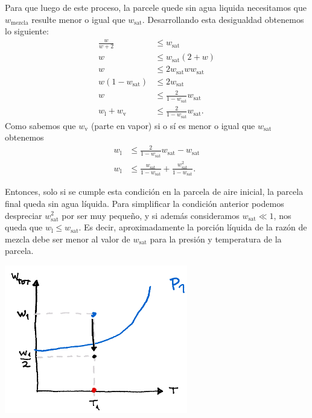 \documentclass[../main.tex]{subfiles}
\begin{document}
\begin{enumerate}[a)]
\begin{enumerate}
Para que luego de este proceso, la parcele quede sin agua liquida necesitamos que $w_\text{mezcla}$ resulte menor o igual que $w_\text{sat}$. Desarrollando esta desigualdad obtenemos lo siguiente:
\begin{align*}
    \frac{w}{w+2} &\le w_\text{sat}\\
    w &\le  w_\text{sat}(2 + w)\\
    w &\le 2w_\text{sat} ww_\text{sat}\\
    w(1-w_\text{sat}) &\le 2w_\text{sat}\\
    w &\le \frac{2}{1-w_\text{sat}} w_\text{sat}\\
    w_\text{l} + w_\text{v} &\le \frac{2}{1-w_\text{sat}} w_\text{sat}
.\end{align*}
Como sabemos que  $w_\text{v}$ (parte en vapor) si o sí es menor o igual que $w_\text{sat}$ obtenemos
    \begin{align*}
    w_\text{l} &\le \frac{2}{1-w_\text{sat}} w_\text{sat} - w_\text{sat}\\
    w_\text{l} &\le \frac{w_\text{sat}}{1- w_\text{sat}} + \frac{w_\text{sat}^2}{1-w_\text{sat}}
    .\end{align*}

Entonces, solo si se cumple esta condición en la parcela de aire inicial, la parcela final queda sin agua líquida. Para simplificar la condición anterior podemos despreciar $w_\text{sat}^2$ por ser muy pequeño, y si además consideramos $w_\text{sat}\ll 1$, nos queda que $w_\text{l} \le w_\text{sat}$. Es decir, aproximadamente la porción líquida de la razón de mezcla debe ser menor al valor de $w_\text{sat}$ para la presión y temperatura de la parcela.\par
\begin{minipage}{\linewidth}
    \centering
    \includegraphics[width=0.6\textwidth]{img/procesoD}
    \label{fig:pD}
    
\end{minipage}

    \end{enumerate}

\end{enumerate}
\end{document}
